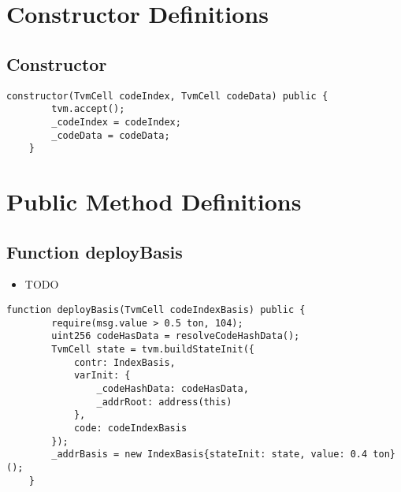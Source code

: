 \section{Constructor Definitions}


\subsection{Constructor}



\begin{lstlisting}[firstnumber=19]
    constructor(TvmCell codeIndex, TvmCell codeData) public {
        tvm.accept();
        _codeIndex = codeIndex;
        _codeData = codeData;
    }
\end{lstlisting}

\section{Public Method Definitions}


\subsection{Function deployBasis}



\begin{itemize}
\item TODO
\end{itemize}


\begin{lstlisting}[firstnumber=33]
    function deployBasis(TvmCell codeIndexBasis) public {
        require(msg.value > 0.5 ton, 104);
        uint256 codeHasData = resolveCodeHashData();
        TvmCell state = tvm.buildStateInit({
            contr: IndexBasis,
            varInit: {
                _codeHashData: codeHasData,
                _addrRoot: address(this)
            },
            code: codeIndexBasis
        });
        _addrBasis = new IndexBasis{stateInit: state, value: 0.4 ton}();
    }
\end{lstlisting}

